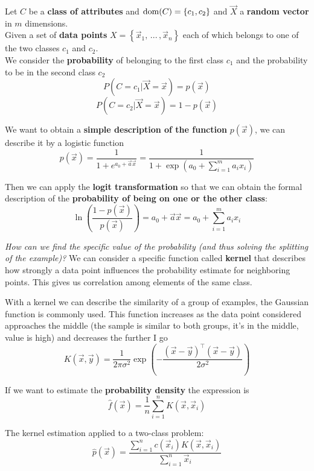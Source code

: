 Let $C$ be a \textbf{class of attributes} and $\operatorname*{dom} (C) = \left\{c_1, c_2\right\}$ and $\vec{X}$ a \textbf{random vector} in $m$ dimensions.\\

Given a set of \textbf{data points} $X = \left\{\vec{x}_1 , \, ... \, , \vec{x}_n \right\}$ each of which belongs to one of the two classes $c_1$ and $c_2$.\\

We consider the \textbf{probability} of belonging to the first class $c_1$ and the probability to be in the second class $c_2$
$$ P (C = c_1 | \vec{X} = \vec{x}) = p(\vec{x}) $$
$$ P (C = c_2 | \vec{X} = \vec{x}) = 1 - p(\vec{x}) $$

We want to obtain a \textbf{simple description of the function} $p(\vec{x})$, we can describe it by a logistic function
$$ p(\vec{x}) = \frac{1}{1 + e^{a_0 + \vec{a} \vec{x}}} = \frac{1}{1 + \exp \left(a_0 + \sum_{i=1}^m a_i x_i \right)} $$

Then we can apply the \textbf{logit transformation} so that we can obtain the formal description of the \textbf{probability of being on one or the other class}:
$$ \ln \left(\frac{1 - p(\vec{x})}{p (\vec{x})}\right) = a_0 + \vec{a} \vec{x} = a_0 + \sum_{i=1}^m a_i x_i $$

\textit{How can we find the specific value of the probability (and thus solving the splitting of the example)?} We can consider a specific function called \textbf{kernel} that describes how strongly a data point influences the probability estimate for neighboring points. This gives us correlation among elements of the same class.\\

\newpage

With a kernel we can describe the similarity of a group of examples, the Gaussian function is commonly used. This function increases as the data point considered approaches the middle (the sample is similar to both groups, it's in the middle, value is high) and decreases the further I go
$$ K (\vec{x}, \vec{y}) = \frac{1}{2 \pi \sigma^2} \exp \left(- \frac{(\vec{x} - \vec{y})^{\top} (\vec{x} - \vec{y})}{2 \sigma^2}\right)$$

If we want to estimate the \textbf{probability density} the expression is
$$ \hat{f} (\vec{x}) = \frac{1}{n} \sum_{i=1}^n K(\vec{x}, \vec{x}_i)$$

The kernel estimation applied to a two-class problem:
$$ \hat{p} (\vec{x}) = \frac{\sum_{i=1}^n c(\vec{x}_i) K(\vec{x}, \vec{x}_i)}{\sum_{i=1}^n \vec{x}_i}$$

